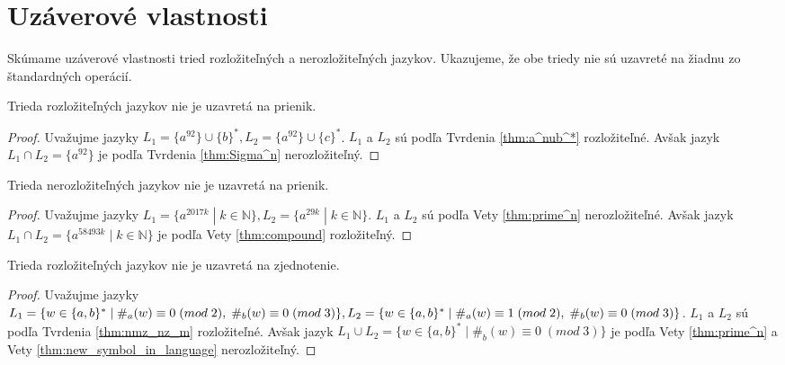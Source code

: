 \section{Uzáverové vlastnosti}

Skúmame uzáverové vlastnosti tried rozložiteľných a nerozložiteľných jazykov. Ukazujeme, že obe triedy nie sú uzavreté na žiadnu zo štandardných operácií.

\begin{proposition}
Trieda rozložiteľných jazykov nie je uzavretá na prienik.
\end{proposition}

\begin{proof}
Uvažujme jazyky $ L_1 = \lbrace a^{92} \rbrace \cup \lbrace b \rbrace^*, L_2 = \lbrace a^{92} \rbrace \cup \lbrace c \rbrace^* $. $ L_1 $ a $ L_2 $ sú podľa Tvrdenia \ref{thm:a^nub^*} rozložiteľné. Avšak jazyk $ L_1 \cap L_2 = \lbrace a^{92} \rbrace $ je podľa Tvrdenia \ref{thm:Sigma^n} nerozložiteľný.
\end{proof}

\begin{proposition}
Trieda nerozložiteľných jazykov nie je uzavretá na prienik.
\end{proposition}

\begin{proof}
Uvažujme jazyky $ L_1 = \lbrace a^{2017k} \; | \; k \in \mathbb{N} \rbrace, L_2 = \lbrace a^{29k} \; | \; k \in \mathbb{N} \rbrace $. $ L_1 $ a $ L_2 $ sú podľa Vety \ref{thm:prime^n} nerozložiteľné. Avšak jazyk $ L_1 \cap L_2 = \lbrace a^{58493k} \; | \; k \in \mathbb{N} \rbrace $ je podľa Vety \ref{thm:compound} rozložiteľný.
\end{proof}

\begin{proposition}
Trieda rozložiteľných jazykov nie je uzavretá na zjednotenie.
\end{proposition}

\begin{proof}
Uvažujme jazyky $ L_1 = \lbrace w \in \lbrace a,b \rbrace^* \; | \; \#_a(w) \equiv 0 \; (mod \; 2), \; \#_b(w) \equiv 0 \; (mod \; 3) \rbrace, \\ L_2 = \lbrace w \in \lbrace a,b \rbrace^* \; | \; \#_a(w) \equiv 1 \; (mod \; 2), \; \#_b(w) \equiv 0 \; (mod \; 3) \rbrace $. $ L_1 $ a $ L_2 $ sú podľa Tvrdenia \ref{thm:nmz_nz_m} rozložiteľné. Avšak jazyk $ L_1 \cup L_2 = \lbrace w \in \lbrace a,b \rbrace^* \; | \; \#_b(w) \equiv 0 \; (mod \; 3) \rbrace $ je podľa Vety \ref{thm:prime^n} a Vety \ref{thm:new_symbol_in_language} nerozložiteľný.
\end{proof}

